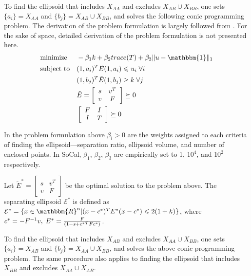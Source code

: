 \documentclass{scrartcl}
\begin{document}
\par
To find the ellipsoid that includes $X_{AA}$ and excludes
$X_{AB} \cup X_{BB}$, one
sets $\{a_i\}=X_{AA}$ and $\{b_j\}=X_{AB} \cup X_{BB}$, and
solves the following conic programming problem.
The derivation of the problem formulation is largely followed from
\cite{glineur1998}.
For the sake of space, detailed derivation of the problem formulation is not
presented here.
\begin{equation*}
\begin{aligned}
& \text{minimize}
&& -{\beta_{1}}k+{\beta_{2}} trace(T)+\beta_{3} \|u-\mathbbm{1}\|_1 \\  
& \text{subject to}
&& (1,a_i)^T\tilde{E}(1,a_i)\leqslant u_i \; \forall i \\
&&&(1,b_j)^T\tilde{E}(1,b_j) \ge k \; \forall j \\
&&&\tilde{E}=
    \left[
        \begin{array}{cc}
            s & v^T \\
            v & F
        \end{array}
    \right] \succeq 0 \\
&&&\left[
        \begin{array}{cc}
            F & I \\
            I & T
        \end{array}
    \right] \succeq 0
\end{aligned}
\end{equation*}

\par
In the problem formulation above $\beta_{i} > 0$ are the weights assigned to
each criteria of finding the ellipsoid---separation ratio, ellipsoid volume,
and number of enclosed points.
In SoCal, $\beta_1$, $\beta_2$, $\beta_3$ are empirically set to 1, $10^4$,
and $10^2$ respectively.

\par
Let 
$\tilde{E}^{*}=\left[
    \begin{array}{cc}
    s & v^T \\
    v & F
    \end{array}
\right]$
be the optimal solution to the problem above.
The separating ellipsoid $\mathcal{E}^{*}$ is defined as
$\mathcal{E}^{*}=
\{x \in \mathbbm{R}^{n}|(x-c^{*})^TE^{*}(x-c^{*})\leqslant2(1+k)\}$,
where $c^{*}=-F^{-1}v,\;E^{*}={{F} \over {(1-s+{c^{*}}^TF{c^{*}})}}$.

\par
To find the ellipsoid that includes $X_{AB}$ and excludes
$X_{AA} \cup X_{BB}$, one sets $\{a_i\}=X_{AB}$ and
$\{b_j\}=X_{AA} \cup X_{BB}$, and solves the above conic programming problem.
The same procedure also applies to finding the ellipsoid that includes $X_{BB}$
and excludes $X_{AA} \cup X_{AB}$.
\end{document}

